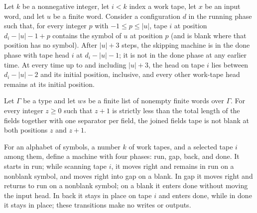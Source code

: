 \begin{theorem}
\label{Turing.skipBackTM_run_ofCfg}
\leanok
{}
Let $k$ be a nonnegative integer, let $i<k$ index a work tape, let $x$ be an input word,
and let $u$ be a finite word. Consider a configuration $d$ in the running phase such
that, for every integer $p$ with $-1\le p\le |u|$, tape $i$ at position $d_i-|u|-1+p$
contains the symbol of $u$ at position $p$ (and is blank where that position has no
symbol). After $|u|+3$ steps, the skipping machine is in the done phase with tape head
$i$ at $d_i-|u|-1$; it is not in the done phase at any earlier time. At every time up to
and including $|u|+3$, the head on tape $i$ lies between $d_i-|u|-2$ and its initial
position, inclusive, and every other work-tape head remains at its initial position.
\end{theorem}

\begin{theorem}
\label{Turing.fieldsTape_no_double_blank}
\leanok
{}
Let $\Gamma$ be a type and let $ws$ be a finite list of nonempty finite words over
$\Gamma$. For every integer $z\ge 0$ such that $z+1$ is strictly less than the total
length of the fields together with one separator per field, the joined fields tape is
not blank at both positions $z$ and $z+1$.
\end{theorem}

\begin{definition}
\label{Turing.seekEndTM}
\leanok
{}
For an alphabet of symbols, a number $k$ of work tapes, and a selected tape $i$ among
them, define a machine with four phases: run, gap, back, and done. It starts in run;
while scanning tape $i$, it moves right and remains in run on a nonblank symbol, and
moves right into gap on a blank. In gap it moves right and returns to run on a nonblank
symbol; on a blank it enters done without moving the input head. In back it stays in
place on tape $i$ and enters done, while in done it stays in place; these transitions
make no writes or outputs.
\end{definition}

